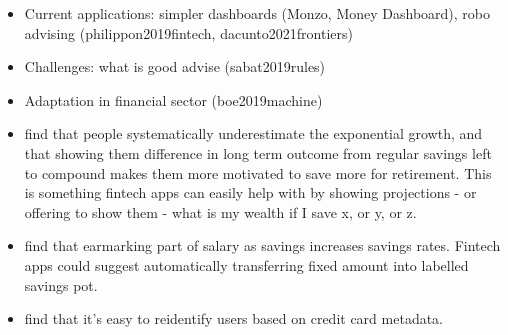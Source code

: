 \begin{itemize}
    \item Current applications: simpler dashboards (Monzo, Money Dashboard),
        robo advising (philippon2019fintech, dacunto2021frontiers)

    \item Challenges: what is good advise (sabat2019rules)

    \item Adaptation in financial sector (boe2019machine)

    \item \citet{mckenzie2011misunderstanding} find that people systematically
        underestimate the exponential growth, and that showing them difference
        in long term outcome from regular savings left to compound makes them
        more motivated to save more for retirement. This is something fintech
        apps can easily help with by showing projections - or offering to show
        them - what is my wealth if I save x, or y, or z.

    \item \citet{soman2011earmarking} find that earmarking part of salary as
        savings increases savings rates. Fintech apps could suggest
        automatically transferring fixed amount into labelled savings pot.
\end{itemize}




\begin{itemize}
    \item \citet{demontjoye2015unique} find that it's easy to reidentify users
        based on credit card metadata.
\end{itemize}

